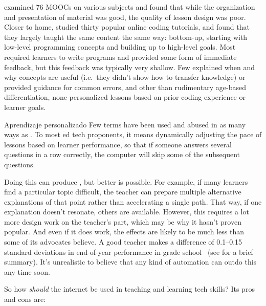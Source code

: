 \cite{Marg2015} examined 76 MOOCs on various subjects and found that
while the organization and presentation of material was good,
the quality of lesson design was poor.
Closer to home,
\cite{Kim2017} studied thirty popular online coding tutorials,
and found that they largely taught the same content the same way:
bottom-up,
starting with low-level programming concepts and building up to high-level goals.
Most required learners to write programs and provided some form of immediate feedback,
but this feedback was typically very shallow.
Few explained when and why concepts are useful
(i.e.\ they didn't show how to transfer knowledge)
or provided guidance for common errors,
and other than rudimentary age-based differentiation,
none personalized lessons based on prior coding experience or learner goals.

\begin{aside}{Aprendizaje personalizado}
  Few terms have been used and abused in as many ways
  as .
  To most ed tech proponents,
  it means dynamically adjusting the pace of lessons based on learner performance,
  so that if someone answers several questions in a row correctly,
  the computer will skip some of the subsequent questions.

  Doing this can produce
  ,
  but better is possible.
  For example,
  if many learners find a particular topic difficult,
  the teacher can prepare multiple alternative explanations of that point
  rather than accelerating a single path.
  That way,
  if one explanation doesn't resonate,
  others are available.
  However,
  this requires a lot more design work on the teacher's part,
  which may be why it hasn't proven popular.
  And even if it does work,
  the effects are likely to be much less than some of its advocates believe.
  A good teacher makes a difference of 0.1--0.15 standard deviations in end-of-year performance in grade school~\cite{Chet2014}
  (see  for a brief summary).
  It's unrealistic to believe that any kind of automation can outdo this any time soon.
\end{aside}

So how \emph{should} the internet be used in teaching and learning tech skills?
Its pros and cons are:

